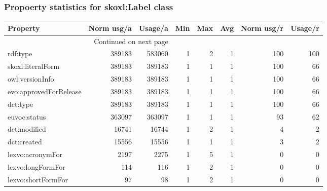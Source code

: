 \documentclass[10pt,a4paper,titlepage,final]{article}
\begin{document}
\subsubsection{Propoerty statistics for skoxl:Label class}
\begin{longtable}{lrrrrrrr}
\toprule
               Property &  Norm usg/a &  Usage/a &  Min &  Max &  Avg &  Norm usg/r &  Usage/r \\
\midrule
\endhead
\midrule
\multicolumn{3}{r}{{Continued on next page}} \\
\midrule
\endfoot

\bottomrule
\endlastfoot
               rdf:type &      389183 &   583060 &    1 &    2 &    1 &         100 &      100 \\
      skoxl:literalForm &      389183 &   389183 &    1 &    1 &    1 &         100 &       66 \\
        owl:versionInfo &      389183 &   389183 &    1 &    1 &    1 &         100 &       66 \\
 evo:approvedForRelease &      389183 &   389183 &    1 &    1 &    1 &         100 &       66 \\
               dct:type &      389183 &   389183 &    1 &    1 &    1 &         100 &       66 \\
           euvoc:status &      363097 &   363097 &    1 &    1 &    1 &          93 &       62 \\
           dct:modified &       16741 &    16744 &    1 &    2 &    1 &           4 &        2 \\
            dct:created &       15556 &    15556 &    1 &    1 &    1 &           3 &        2 \\
       lexvo:acronymFor &        2197 &     2275 &    1 &    5 &    1 &           0 &        0 \\
      lexvo:longFormFor &         114 &      116 &    1 &    2 &    1 &           0 &        0 \\
     lexvo:shortFormFor &          97 &       98 &    1 &    2 &    1 &           0 &        0 \\
\end{longtable}
\end{document}
